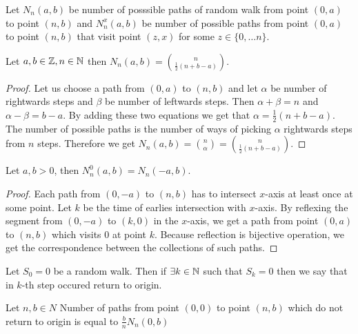 \begin{defn}
  Let $N_n(a,b)$ be number of posssible paths of random walk \rw from point $(0,a)$ to point $(n,b)$ and $N_n^x(a,b)$ be number of possible paths from point $(0,a)$ to point $(n,b)$ that visit point $(z,x)$ for some $z \in \{0, \ldots n \}$.
\end{defn}
\begin{thm}\label{thm-num_of_paths}
  Let $a,b \in \mathbb{Z}, n \in \mathbb{N}$ then $N_n(a,b)=\binom{n}{\frac{1}{2}(n+b-a)}.$
\end{thm}
\begin{proof}
  Let us choose a path from $(0,a)$ to $(n,b)$ and let $\alpha$ be number of rightwards steps and $\beta$ be number of leftwards steps. Then $\alpha+\beta=n$ and $\alpha-\beta=b-a$. By adding these two equations we get that $\alpha=\frac{1}{2}(n+b-a)$. The number of possible paths is the number of ways of picking $\alpha$ rightwards steps from $n$ steps. Therefore we get $N_n(a,b)=\binom{n}{\alpha}=\binom{n}{\frac{1}{2}(n+b-a)}.$
\end{proof}
\begin{thm}
  Let $a,b >0$, then $N_n^0(a,b)=N_n(-a,b)$.
\end{thm}
\begin{proof}
  Each path from $(0,-a)$ to $(n,b)$ has to intersect $x$-axis at least once at some point. Let $k$ be the time of earlies intersection with $x$-axis. By reflexing the segment from $(0,-a)$ to $(k,0)$ in the $x$-axis, we get a path from point $(0,a)$ to $(n,b)$ which visits $0$ at point $k$. Because reflection is bijective operation, we get the correspondence between the collections of such paths.
\end{proof}
\begin{defn}
  Let $S_0=0$ \rw be a random walk. Then if $\exists k \in \mathbb{N}$ such that $S_k=0$ then we say that in $k$-th step occured return to origin.
\end{defn}
\begin{thm}\label{thm-ballot}
  Let $n,b \in N$
  Number of paths from point $(0,0)$ to point $(n,b)$ which do not return to origin is equal to $\frac{b}{n}N_n(0,b)$
\end{thm}
